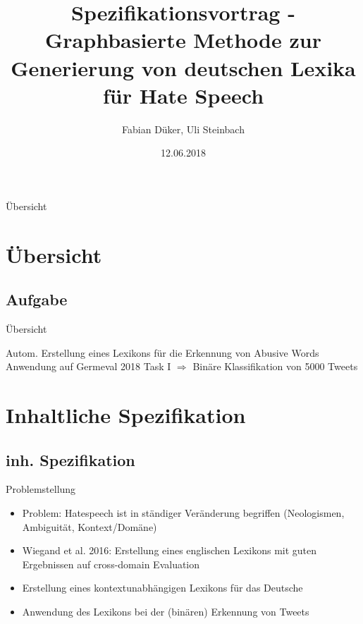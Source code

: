\documentclass{beamer}
\begin{document}
\title[]{Spezifikationsvortrag - Graphbasierte Methode zur Generierung von deutschen Lexika für Hate Speech}
\author[]{Fabian Düker, Uli Steinbach}
\date{12.06.2018}

\frame{\titlepage}
\begin{frame}[allowframebreaks]{Übersicht}
\tableofcontents
\end{frame}



\section{Übersicht}

\subsection[Aufgabe]{Aufgabe }

\begin{frame}{Übersicht}
\begin{block}{Autom. Erstellung eines Lexikons für die Erkennung von Abusive Words }
Anwendung auf Germeval 2018 Task I $\Rightarrow$ Binäre Klassifikation von 5000 Tweets 
\end{block}
\end{frame}


\section{Inhaltliche Spezifikation}
\subsection[inh. Spez.]{ inh. Spezifikation }

\begin{frame}{Problemstellung}
\begin{itemize}
	\item Problem: Hatespeech ist in ständiger Veränderung begriffen (Neologismen, Ambiguität, Kontext/Domäne)
	\item Wiegand et al. 2016: Erstellung eines englischen Lexikons mit guten Ergebnissen auf cross-domain Evaluation
	\item Erstellung eines kontextunabhängigen Lexikons für das Deutsche
	\item Anwendung des Lexikons bei der (binären) Erkennung von Tweets

\end{itemize}
\end{frame}
\end{document}
